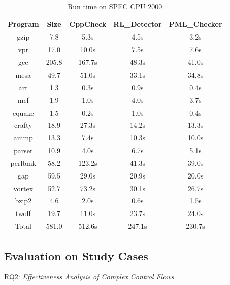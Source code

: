 \begin{table}[!h]
\centering
\caption{Run time on SPEC CPU $2000$}\label{tab:6}
\centering
\begin{tabular}{|c|c|c|c|c|}
\hline
\textbf{Program}& \textbf{Size} & \textbf{CppCheck} & \textbf{RL\_Detector} & \textbf{PML\_Checker}\\
\hline
gzip       & 7.8    & 5.3s  & 4.5s & 3.2s\\
\hline
vpr        & 17.0   & 10.0s  & 7.5s & 7.6s\\
\hline
gcc        & 205.8 & 167.7s  & 48.3s & 41.0s \\
\hline
mesa     & 49.7   & 51.0s  & 33.1s & 34.8s\\
\hline
art         & 1.3     & 0.3s  & 0.9s & 0.4s\\
\hline
mcf        & 1.9     & 1.0s  & 4.0s & 3.7s\\
\hline
equake   & 1.5     & 0.2s  & 1.0s & 0.4s\\
\hline
crafty     & 18.9   & 27.3s	 & 14.2s	 & 13.3s\\
\hline
ammp    & 13.3   & 7.4s & 10.3s & 10.0s\\
\hline
parser    & 10.9   & 4.0s	 & 6.7s	 & 5.1s\\
\hline
perlbmk & 58.2   & 123.2s   & 41.3s	 & 39.0s\\
\hline
gap        & 59.5   &  29.0s & 20.9s & 20.0s\\
\hline
vortex    & 52.7    & 73.2s	 & 30.1s	 & 26.7s\\
\hline 
bzip2     & 4.6      & 2.0s & 0.6s	 & 1.5s\\
\hline
twolf     & 19.7     & 11.0s & 23.7s	 & 24.0s\\
\hline
Total     & 581.0    & 512.6s & 247.1s & 230.7s\\
\hline
\end{tabular}
\end{table}

\subsection{Evaluation on Study Cases}

\noindent RQ2: \textit{Effectiveness Analysis of Complex Control Flows}

